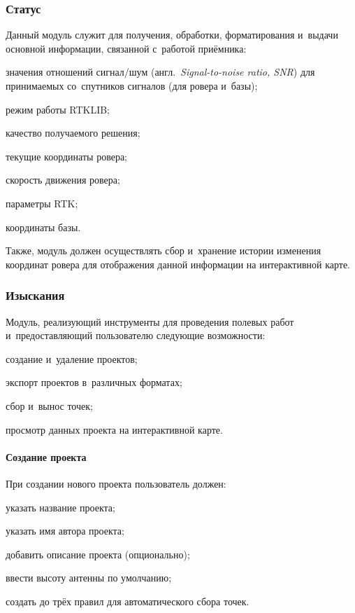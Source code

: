 \subsubsection{Статус}

Данный модуль служит для получения, обработки, форматирования и~выдачи основной информации, связанной с~работой приёмника:
\begin{dashitemize}
  \item значения отношений сигнал/шум (англ.~\emph{Signal-to-noise ratio, SNR}) для принимаемых со~спутников сигналов (для ровера и~базы);
  \item режим работы RTKLIB;
  \item качество получаемого решения;
  \item текущие координаты ровера;
  \item скорость движения ровера;
  \item параметры RTK;
  \item координаты базы.
\end{dashitemize}

Также, модуль должен осуществлять сбор и~хранение истории изменения координат ровера для отображения данной информации на интерактивной карте.


\subsubsection{Изыскания}

Модуль, реализующий инструменты для проведения полевых работ и~предоставляющий пользователю следующие возможности:
\begin{dashitemize}
  \item создание и~удаление проектов;
  \item экспорт проектов в~различных форматах;
  \item сбор и~вынос точек;
  \item просмотр данных проекта на интерактивной карте.
\end{dashitemize}

\paragraph{Создание проекта}

При создании нового проекта пользователь должен:
\begin{dashitemize}
  \item указать название проекта;
  \item указать имя автора проекта;
  \item добавить описание проекта (опционально);
  \item ввести высоту антенны по умолчанию;
  \item создать до трёх правил для автоматического сбора точек.
\end{dashitemize}

